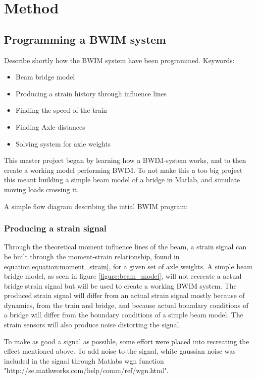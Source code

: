 \section{Method}

\subsection{Programming a BWIM system}
Describe shortly how the BWIM system have been programmed.
Keywords:
\begin{itemize}
\item Beam bridge model
\item Producing a strain history through influence lines
\item Finding the speed of the train
\item Finding Axle distances
\item Solving system for axle weights
\end{itemize}
This master project began by learning how a BWIM-system works, and to then create a working model performing BWIM. To not make this a too big project this meant building a simple beam model of a bridge in Matlab, and simulate moving loads crossing it.

A simple flow diagram describing the intial BWIM program:
\begin{figure}

\end{figure}


\subsubsection{Producing a strain signal}
Through the theoretical moment influence lines of the beam, a strain signal can be built through the moment-strain relationship, found in equation\ref{equation:moment_strain}, for a given set of axle weights. A simple beam bridge model, as seen in figure \ref{figure:beam_model}, will not recreate a actual bridge strain signal but will be used to create a working BWIM system. The produced strain signal will differ from an actual strain signal mostly because of dynamics, from the train and bridge, and because actual boundary conditions of a bridge will differ from the boundary conditions of a simple beam model. The strain sensors will also produce noise distorting the signal.

To make as good a signal as possible, some effort were placed into recreating the effect mentioned above. To add noise to the signal, white gaussian noise was included in the signal through Matlabs wgn function "http://se.mathworks.com/help/comm/ref/wgn.html".


